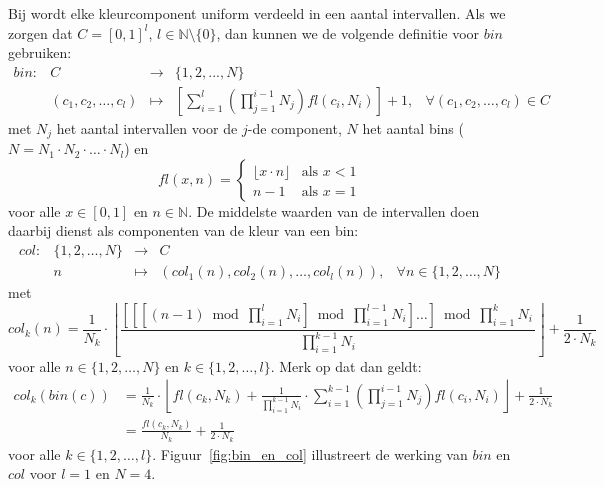Bij  wordt elke kleurcomponent uniform verdeeld in een 
aantal intervallen. Als we zorgen dat $C=[0,1]^l$, $l \in \mathbb{N} \setminus \{0\}$, 
dan kunnen we de volgende definitie voor $bin$ gebruiken:
\begin{displaymath}
\begin{array}{lrcll}
bin: & C & \to & \{1,2,...,N\}\\[5pt] & (c_1,c_2,\ldots,c_l) & \mapsto & \left[ 
\displaystyle\sum_{i=1}^l \left( \prod_{j=1}^{i-1} N_j \right) \mathit{fl}(c_i, N_i) \right] 
+ 1, & \forall (c_1,c_2,\ldots,c_l) \in C
\end{array}
\end{displaymath}
met $N_j$ het aantal intervallen voor de $j$-de component, $N$ het aantal 
bins ($N=N_1 \cdot N_2 \cdot \ldots \cdot N_l$) en 
\begin{displaymath}
\mathit{fl}(x,n) = \begin{cases}
\lfloor x \cdot n \rfloor & \textrm{als } x < 1 \\ 
n - 1 & \textrm{als } x = 1
\end{cases}
\end{displaymath}
voor alle $x \in [0,1]$ en $n \in \mathbb{N}$. De middelste waarden van de 
intervallen doen daarbij dienst als componenten van de kleur van een bin:
\begin{displaymath}
\begin{array}{lrcll}
col: & \{1,2,\ldots,N\} & \to & C \\ & n & \mapsto & (col_1(n), col_2(n), 
\dots, col_l(n)), & \forall n \in \{1,2,\ldots,N\}
\end{array}
\end{displaymath}
met 
\begin{displaymath}
col_k(n) = \frac{1}{N_k}\cdot\left\lfloor\frac{\left[\left[\left[(n-1) \bmod \prod_{i=1}^l N_i\right] \bmod \prod_{i=1}^{l-1}N_i\right] \ldots \right] \bmod \prod_{i=1}^k N_i\,}{\prod_{i=1}^{k-1} N_i}\right\rfloor + \frac{1}{2 \cdot N_k}
\end{displaymath} 
voor alle $n \in \{1,2,\ldots,N\}$ en $k \in \{1,2,\ldots,l\}$. Merk op dat dan geldt:
\begin{align*}
col_k(bin(c)) 
&= \frac{1}{N_k}\cdot\left\lfloor \mathit{fl}(c_k,N_k) + \frac{1}{\prod_{i=1}^{k-1} N_i}\cdot\sum_{i=1}^{k-1} \left( \prod_{j=1}^{i-1} N_j \right) \mathit{fl}(c_i, N_i)\right\rfloor + \frac{1}{2 \cdot N_k}\\[2pt]
&= \frac{\mathit{fl}(c_k,N_k)}{N_k}+\frac{1}{2\cdot N_k}
\end{align*}
voor alle $k \in \{1,2,\ldots,l\}$. Figuur~\ref{fig:bin_en_col}
illustreert de werking van $bin$ en $col$ voor $l=1$ en $N=4$.

